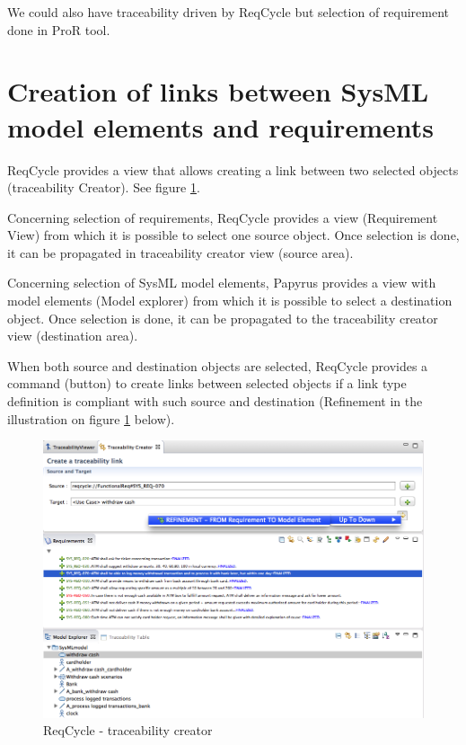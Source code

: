 \documentclass[11pt]{template/openetcs_report}
\begin{document}
We could also have traceability driven by ReqCycle but selection of requirement done in ProR tool.

\section{Creation of links between SysML model elements and requirements}
\label{sec-6-3}
ReqCycle provides a view that allows creating a link between two selected objects (traceability Creator). See figure \ref{fig:trace_second-TraceabilityCreator}.

Concerning selection of requirements, ReqCycle provides a view (Requirement View) from which it is possible to select one source object. Once selection is done, it can be propagated in traceability creator view (source area).

Concerning selection of SysML model elements, Papyrus provides a view with model elements (Model explorer) from which it is possible to select a destination object. Once selection is done, it can be propagated to the traceability creator view (destination area).

When both source and destination objects are selected, ReqCycle provides a command (button) to create links between selected objects if a link type definition is compliant with such source and destination (Refinement in the illustration on figure \ref{fig:trace_second-TraceabilityCreator} below).

\begin{figure}[htbp]
\centering
\includegraphics[width=1.0\linewidth]{images/second_trace_solution_TraceabilityCreator.png}
\caption{\label{fig:trace_second-TraceabilityCreator}ReqCycle - traceability creator}
\end{figure}
\end{document}
